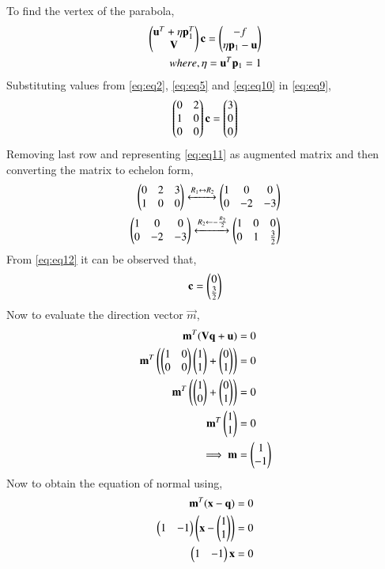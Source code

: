 \documentclass[journal,12pt,twocolumn]{IEEEtran}
\begin{document}
To find the vertex of the parabola,
\begin{align}
    \begin{pmatrix}\mathbf{u}^T+\eta \mathbf{p}_1^T \\ \mathbf{V}\end{pmatrix}\mathbf{c} = \begin{pmatrix}-f \\ \eta \mathbf{p}_1-\mathbf{u}\end{pmatrix} \label{eq:eq9} \\
    where, \eta = \mathbf{u}^T\mathbf{p}_1 = 1 \label{eq:eq10}
\end{align}
Substituting values from \eqref{eq:eq2}, \eqref{eq:eq5} and \eqref{eq:eq10} in \eqref{eq:eq9}, 
\begin{align}
    \begin{pmatrix}0 & 2 \\ 1 & 0 \\ 0 & 0\end{pmatrix}\mathbf{c}=\begin{pmatrix}3 \\ 0 \\ 0\end{pmatrix} \label{eq:eq11}
\end{align}
Removing last row and representing \eqref{eq:eq11} as augmented matrix and then converting the matrix to echelon form,
\begin{align}
    \begin{pmatrix}0 & 2 & 3 \\ 1 & 0 & 0\end{pmatrix} \xleftrightarrow[]{R_1\leftrightarrow R_2} \begin{pmatrix}1 & 0 & 0 \\ 0 & -2 & -3\end{pmatrix}\\
    \begin{pmatrix}1 & 0 & 0 \\ 0 & -2 & -3\end{pmatrix} \xleftrightarrow[]{R_2\leftarrow -\frac{R_2}{2}} \begin{pmatrix}1 & 0 & 0 \\ 0 & 1 & \frac{3}{2}\end{pmatrix}\label{eq:eq12}
\end{align}
From \eqref{eq:eq12} it can be observed that,
\begin{align}
    \mathbf{c} = \begin{pmatrix}0 \\ \frac{3}{2}\end{pmatrix} \label{eq:eq13}
\end{align}
Now to evaluate the direction vector $\vec{m}$,
\begin{align}
    \mathbf{m}^T(\mathbf{V}\mathbf{q} + \mathbf{u}) &= 0 \\
    \mathbf{m}^T\begin{pmatrix}\begin{pmatrix}1 & 0 \\ 0 & 0\end{pmatrix}\begin{pmatrix}1 \\ 1\end{pmatrix} +\begin{pmatrix}0 \\ 1\end{pmatrix}\end{pmatrix} &= 0 \\
    \mathbf{m}^T\begin{pmatrix}\begin{pmatrix}1 \\ 0\end{pmatrix} +\begin{pmatrix}0 \\ 1\end{pmatrix}\end{pmatrix} &= 0 \\
    \mathbf{m}^T\begin{pmatrix}1 \\ 1\end{pmatrix} &= 0 \\
    \implies \mathbf{m} &= \begin{pmatrix}1 \\ -1\end{pmatrix} \label{eq:eq14}
\end{align}
Now to obtain the equation of normal using,
\begin{align}
    \mathbf{m}^T(\mathbf{x} - \mathbf{q}) &= 0 \\
    \begin{pmatrix}1 & -1\end{pmatrix}\begin{pmatrix}\mathbf{x} - \begin{pmatrix}1 \\ 1\end{pmatrix}\end{pmatrix} &= 0 \\
    \begin{pmatrix}1 & -1\end{pmatrix}\mathbf{x} &= 0 
\end{align}
\end{document}
